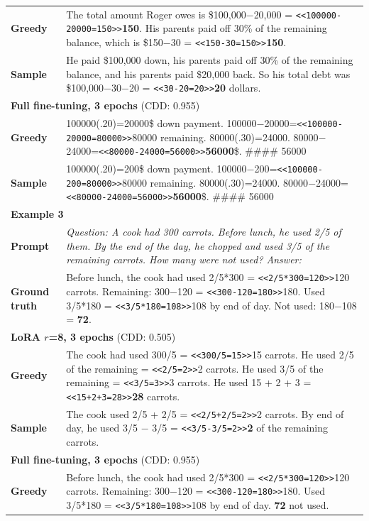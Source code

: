 \documentclass[11pt]{article}
\begin{document}
\begin{table}[t]
\begin{tabular}{p{1.8cm}p{13.5cm}}
\textbf{Greedy} & The total amount Roger owes is \$100,000$-$20,000 = \texttt{<<100000-20000=150>>}\textbf{150}. His parents paid off 30\% of the remaining balance, which is \$150$-$30 = \texttt{<<150-30=150>>}\textbf{150}. \\
\textbf{Sample} & He paid \$100,000 down, his parents paid off 30\% of the remaining balance, and his parents paid \$20,000 back. So his total debt was \$100,000$-$30$-$20 = \texttt{<<30-20=20>>}\textbf{20} dollars. \\
\midrule
\multicolumn{2}{l}{\textbf{Full fine-tuning, 3 epochs} (CDD: 0.955)} \\
\textbf{Greedy} & 100000(.20)=20000\$ down payment. 100000$-$20000=\texttt{<<100000-20000=80000>>}80000 remaining. 80000(.30)=24000. 80000$-$24000=\texttt{<<80000-24000=56000>>}\textbf{56000}\$. \#\#\#\# 56000 \\
\textbf{Sample} & 100000(.20)=200\$ down payment. 100000$-$200=\texttt{<<100000-200=80000>>}80000 remaining. 80000(.30)=24000. 80000$-$24000=\texttt{<<80000-24000=56000>>}\textbf{56000}\$. \#\#\#\# 56000 \\
\midrule
\midrule
\multicolumn{2}{l}{\textbf{Example 3}} \\
\midrule
\textbf{Prompt} & \textit{Question: A cook had 300 carrots. Before lunch, he used 2/5 of them. By the end of the day, he chopped and used 3/5 of the remaining carrots. How many were not used? Answer:} \\
\textbf{Ground truth} & Before lunch, the cook had used 2/5*300 = \texttt{<<2/5*300=120>>}120 carrots. Remaining: 300$-$120 = \texttt{<<300-120=180>>}180. Used 3/5*180 = \texttt{<<3/5*180=108>>}108 by end of day. Not used: 180$-$108 = \textbf{72}. \\
\midrule
\multicolumn{2}{l}{\textbf{LoRA $r$=8, 3 epochs} (CDD: 0.505)} \\
\textbf{Greedy} & The cook had used 300/5 = \texttt{<<300/5=15>>}15 carrots. He used 2/5 of the remaining = \texttt{<<2/5=2>>}2 carrots. He used 3/5 of the remaining = \texttt{<<3/5=3>>}3 carrots. He used 15 + 2 + 3 = \texttt{<<15+2+3=28>>}\textbf{28} carrots. \\
\textbf{Sample} & The cook used 2/5 + 2/5 = \texttt{<<2/5+2/5=2>>}2 carrots. By end of day, he used 3/5 $-$ 3/5 = \texttt{<<3/5-3/5=2>>}\textbf{2} of the remaining carrots. \\
\midrule
\multicolumn{2}{l}{\textbf{Full fine-tuning, 3 epochs} (CDD: 0.955)} \\
\textbf{Greedy} & Before lunch, the cook had used 2/5*300 = \texttt{<<2/5*300=120>>}120 carrots. Remaining: 300$-$120 = \texttt{<<300-120=180>>}180. Used 3/5*180 = \texttt{<<3/5*180=108>>}108 by end of day. \textbf{72} not used. \\

\end{tabular}
\end{table}
\end{document}
